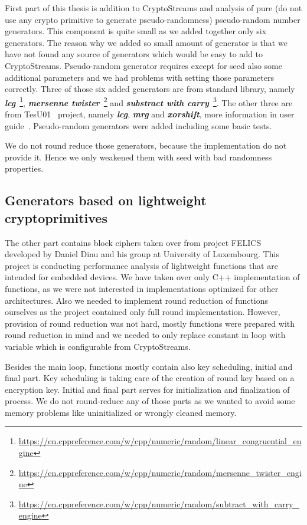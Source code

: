 \documentclass[
    digital,    %
    oneside,    %
    color,
    11pt,
    nocover,
    notable,
    nolof,
    nolot,
    final
]{fithesis3}
\begin{document}
First part of this thesis is addition to CryptoStreams and analysis of pure (do not use any crypto primitive to generate pseudo-randomness) pseudo-random number generators. This component is quite small as we added together only six generators. The reason why we added so small amount of generator is that we have not found any source of generators which would be easy to add to CryptoStreams. Pseudo-random generator requires except for seed also some additional parameters and we had problems with setting those parameters correctly. Three of those six added generators are from standard library, namely \textit{\textbf{lcg}}~\footnote{\url{ https://en.cppreference.com/w/cpp/numeric/random/linear\_congruential\_engine}}, \textbf{\textit{mersenne twister}}~\footnote{\url{https://en.cppreference.com/w/cpp/numeric/random/mersenne\_twister\_engine}} and \textbf{\textit{substract with carry}}~\footnote{\url{https://en.cppreference.com/w/cpp/numeric/random/subtract\_with\_carry_engine}}. The other three are from TesU01~\cite{l2007testu01} project, namely \textbf{\textit{lcg}}, \textbf{\textit{mrg}} and \textbf{\textit{xorshift}}, more information in user guide~\cite{LEcuyer07testu01}. Pseudo-random generators were added including some basic tests.

We do not round reduce those generators, because the implementation do not provide it. Hence we only weakened them with seed with bad randomness properties.

\subsection{Generators based on lightweight cryptoprimitives}

The other part contains block ciphers taken over from project FELICS~\cite{dinu2015felics} developed by Daniel Dinu and his group at University of Luxembourg. This project is conducting performance analysis of lightweight functions that are intended for embedded devices. We have taken over only C++ implementation of functions, as we were not interested in implementations optimized for other architectures. Also we needed to implement round reduction of functions ourselves as the project contained only full round implementation. However, provision of round reduction was not hard, mostly functions were prepared with round reduction in mind and we needed to only replace constant in loop with variable which is configurable from CryptoStreams. 

Besides the main loop, functions mostly contain also key scheduling, initial and final part. Key scheduling is taking care of the creation of round key based on a encryption key. Initial and final part serves for initialization and finalization of process. We do not round-reduce any of those parts as we wanted to avoid some memory problems like uninitialized or wrongly cleaned memory.
\end{document}
